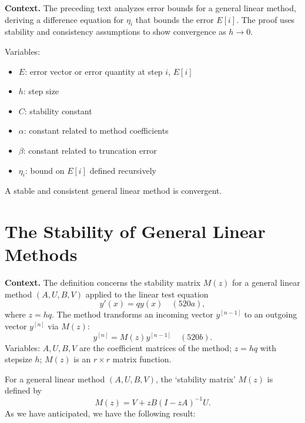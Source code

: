\noindent\textbf{Context.}
The preceding text analyzes error bounds for a general linear method, deriving a difference equation for $\eta_i$ that bounds the error $E[i]$. The proof uses stability and consistency assumptions to show convergence as $h \to 0$.

Variables:
\begin{itemize}
    \item $E$: error vector or error quantity at step $i$, $E[i]$
    \item $h$: step size
    \item $C$: stability constant
    \item $\alpha$: constant related to method coefficients
    \item $\beta$: constant related to truncation error
    \item $\eta_i$: bound on $E[i]$ defined recursively
\end{itemize}

\begin{theorem}

  \label{thm:515D}
A stable and consistent general linear method is convergent.
\end{theorem}

\section{The Stability of General Linear Methods}

\noindent\textbf{Context.}
The definition concerns the stability matrix \(M(z)\) for a general linear method \((A, U, B, V)\) applied to the linear test equation
\[
y'(x) = qy(x) \quad (520a),
\]
where \(z = hq\). The method transforms an incoming vector \(y^{[n-1]}\) to an outgoing vector \(y^{[n]}\) via \(M(z)\):
\[
y^{[n]} = M(z)y^{[n-1]} \quad (520b).
\]
Variables: \(A, U, B, V\) are the coefficient matrices of the method; \(z = hq\) with stepsize \(h\); \(M(z)\) is an \(r \times r\) matrix function.

\begin{definition}[Introduction (520A)]

  \label{def:520A}
For a general linear method $(A, U, B, V)$, the `stability matrix' $M(z)$ is defined by
\[
M(z) = V + zB(I - zA)^{-1}U.
\]
As we have anticipated, we have the following result:
\end{definition}

